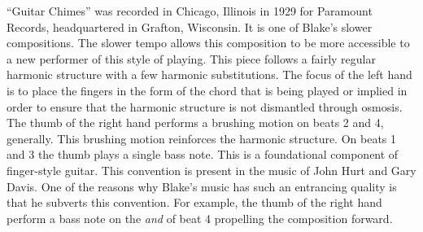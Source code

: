 \documentclass{tufte-handout}
\begin{document}
``Guitar Chimes'' was recorded in Chicago, Illinois in 1929 for
Paramount Records, headquartered in Grafton, Wisconsin. It is one of
Blake's slower compositions. The slower tempo allows this composition
to be more accessible to a new performer of this style of
playing. This piece follows a fairly regular harmonic structure with a
few harmonic substitutions. The focus of the left hand is to place the
fingers in the form of the chord that is being played or implied in
order to ensure that the harmonic structure is not dismantled through
osmosis. The thumb of the right hand performs a brushing motion on
beats 2 and 4, generally. This brushing motion reinforces the harmonic
structure. On beats 1 and 3 the thumb plays a single bass note. This
is a foundational component of finger-style guitar. This convention is
present in the music of John Hurt and Gary Davis. One of the reasons
why Blake's music has such an entrancing quality is that he subverts
this convention. For example, the thumb of the right hand perform a
bass note on the \emph{and} of beat 4 propelling the composition
forward.
\end{document}
